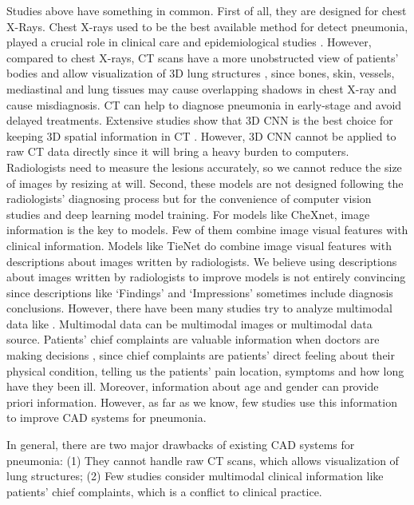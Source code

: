 \documentclass[journal]{IEEEtran}
\begin{document}
Studies above have something in common. First of all, they are designed for chest X-Rays. Chest X-rays used to be the best available method for detect pneumonia, played a crucial role in clinical care and epidemiological studies \cite{Franquet2001Imaging, Thomas2005Standardized}. 
However, compared to chest X-rays, CT scans have a more unobstructed view of patients' bodies and allow visualization of 3D lung structures \cite{korfiatis2009texture}, since bones, skin, vessels, mediastinal and lung tissues may cause overlapping shadows in chest X-ray and cause misdiagnosis. CT can help to diagnose pneumonia in early-stage and avoid delayed treatments.
Extensive studies show that 3D CNN is the best choice for keeping 3D spatial information in CT \cite{Yorozu1987Electron}. However, 3D CNN cannot be applied to raw CT data directly since it will bring a heavy burden to computers. Radiologists need to measure the lesions accurately, so we cannot reduce the size of images by resizing at will.
Second, these models are not designed following the radiologists' diagnosing process but for the convenience of computer vision studies and deep learning model training. For models like CheXnet, image information is the key to models. Few of them combine image visual features with clinical information. 
Models like TieNet do combine image visual features with descriptions about images written by radiologists. We believe using descriptions about images written by radiologists to improve models is not entirely convincing since descriptions like `Findings' and `Impressions' sometimes include diagnosis conclusions.
However, there have been many studies try to analyze multimodal data like \cite{hu2019deep, xiao2018alternating}. Multimodal data can be multimodal images \cite{dou2016multilevel} or multimodal data source. 
Patients' chief complaints are valuable information when doctors are making decisions \cite{wu2018master}, since chief complaints are patients' direct feeling about their physical condition, telling us the patients' pain location, symptoms and how long have they been ill. Moreover, information about age and gender can provide priori information\cite{xiaojian2011analysis, huang2014design}. However, as far as we know, few studies use this information to improve CAD systems for pneumonia. 

In general, there are two major drawbacks of existing CAD systems for pneumonia: (1) They cannot handle raw CT scans, which allows visualization of lung structures; (2) Few studies consider multimodal clinical information like patients' chief complaints, which is a conflict to clinical practice.
\end{document}
